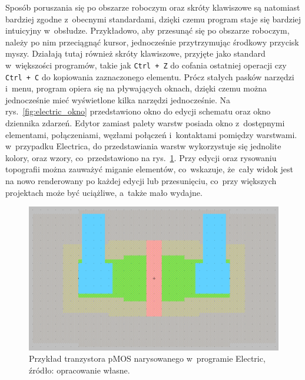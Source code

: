 \indent Sposób poruszania się po obszarze roboczym oraz skróty klawiszowe są natomiast bardziej zgodne z~obecnymi standardami,
dzięki czemu program staje się bardziej intuicyjny w~obsłudze.
Przykładowo, aby przesunąć się po obszarze roboczym, należy po nim przeciągnąć kursor,
jednocześnie przytrzymując środkowy przycisk myszy.
Działają tutaj również skróty klawiszowe, przyjęte jako standard w~większości programów,
takie jak \texttt{Ctrl + Z} do cofania ostatniej operacji czy \texttt{Ctrl + C} do kopiowania zaznaczonego elementu.
Prócz stałych pasków narzędzi i~menu, program opiera się na pływających oknach,
dzięki czemu można jednocześnie mieć wyświetlone kilka narzędzi jednocześnie.
Na rys.~\ref{fig:electric_okno} przedstawiono okno do edycji schematu oraz okno dziennika zdarzeń.
Edytor zamiast palety warstw posiada okno z~dostępnymi elementami, połączeniami, węzłami połączeń
i~kontaktami pomiędzy warstwami.
w~przypadku Electrica, do przedstawiania warstw wykorzystuje się jednolite kolory, oraz wzory,
co~przedstawiono na rys.~\ref{fig:electric_tran}.
Przy edycji oraz rysowaniu topografii można zauważyć miganie elementów,
co~wskazuje, że~cały widok jest na nowo renderowany po każdej edycji lub przesunięciu,
co~przy większych projektach może być uciążliwe, a~także mało wydajne.

\begin{figure}[h]
    \centering
    \includegraphics[width=.9\textwidth]{chapters/chapter2/img/electric_tran}
    \caption[Przykład tranzystora pMOS narysowanego w~programie Electric]
    {
        Przykład tranzystora pMOS narysowanego w~programie Electric,
        źródło: opracowanie własne.
    }
    \label{fig:electric_tran}
\end{figure}

